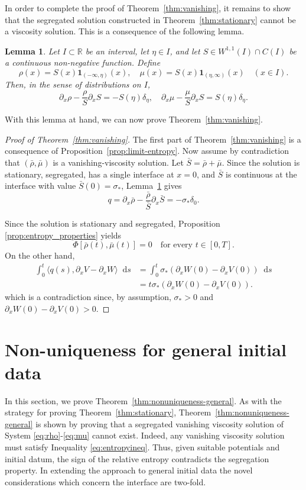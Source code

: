 \documentclass[a4paper,twosided, 11pt]{article}
\newcommand{\R}{\mathbb{R}}
\theoremstyle{plain}
\newtheorem{lemma}[thm]{Lemma}
\theoremstyle{remark}
\newcommand{\one}{\mathbf{1}}
\newcommand{\diff}{\mathop{} \mathrm{d}}
\numberwithin{equation}{section}
\begin{document}
In order to complete the proof of Theorem~\ref{thm:vanishing}, it remains to show that the segregated solution constructed in Theorem~\ref{thm:stationary} cannot be a viscosity solution. This is a consequence of the following lemma.

\begin{lemma}
\label{lem:dirac_interface}
Let $I\subset\R$ be an interval, let $\eta\in I$, and let $S\in W^{1,1}(I)\cap C(I)$ be a continuous non-negative function. Define
$$
\rho(x)=S(x)\one_{(-\infty,\eta)}(x), \quad \mu(x)=S(x)\one_{(\eta,\infty)}(x) \quad (x\in I).
$$
Then, in the sense of distributions on $I$,
$$
\partial_x\rho-\frac{\rho}{S}\partial_xS=-S(\eta)\delta_{\eta},
\quad \partial_x\mu-\frac{\mu}{S}\partial_xS=S(\eta)\delta_{\eta}.
$$
\end{lemma}

With this lemma at hand, we can now prove Theorem~\ref{thm:vanishing}.

\begin{proof}[Proof of Theorem~\ref{thm:vanishing}]
The first part of Theorem~\ref{thm:vanishing} is a consequence of Proposition~\ref{prop:limit-entropy}. Now assume by contradiction that $(\bar\rho,\bar\mu)$ is a vanishing-viscosity solution. Let $\bar S=\bar\rho+\bar\mu$. Since the solution is stationary, segregated, has a single interface at $x=0$, and $\bar S$ is continuous at the interface with value $\bar S(0)=\sigma_*$, Lemma~\ref{lem:dirac_interface} gives
$$
q=\partial_x\bar\rho-\frac{\bar\rho}{\bar S}\partial_x\bar S=-\sigma_*\delta_0.
$$ 

Since the solution is stationary and segregated, Proposition \ref{prop:entropy_properties} yields
$$
\Phi[\bar\rho(t),\bar\mu(t)]=0 \quad\text{for every }t\in[0,T].
$$
On the other hand,
\begin{align*}
\int_0^t \langle q(s), \partial_x V-\partial_x W\rangle\diff  s
&=\int_0^t \sigma_*\left(\partial_x W(0)-\partial_x V(0)\right)\diff  s
\\
&=t \sigma_*\left(\partial_x W(0)-\partial_x V(0)\right).
\end{align*}
which is a contradiction since, by assumption, $\sigma_{*}>0$ and $\partial_x W(0)-\partial_x V(0)>0$.
\end{proof}

\section{Non-uniqueness for general initial data}

In this section, we prove Theorem~\ref{thm:nonuniqueness-general}. 
As with the strategy for proving Theorem~\ref{thm:stationary}, Theorem~\ref{thm:nonuniqueness-general} is shown by proving that a segregated vanishing viscosity solution of System \eqref{eq:rho}-\eqref{eq:mu} cannot exist. 
Indeed, any vanishing viscosity solution must satisfy Inequality \eqref{eq:entropyineq}.
Thus, given suitable potentials and initial datum, the sign of the relative entropy contradicts the segregation property. 
In extending the approach to general initial data the novel considerations which concern the interface are two-fold. 
\end{document}

